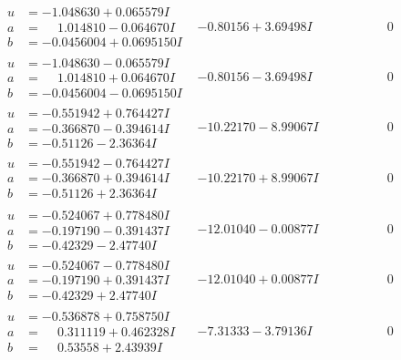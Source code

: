 \documentclass[1p]{elsarticle_modified}
\theoremstyle{definition}
\begin{document}
$$\begin{array}{c|c|c}
\begin{aligned}
u &= -1.048630 + 0.065579 I \\
a &= \phantom{-}1.014810 - 0.064670 I \\
b &= -0.0456004 + 0.0695150 I\end{aligned}
 & -0.80156 + 3.69498 I & \phantom{-0.000000 } 0 \\ \hline\begin{aligned}
u &= -1.048630 - 0.065579 I \\
a &= \phantom{-}1.014810 + 0.064670 I \\
b &= -0.0456004 - 0.0695150 I\end{aligned}
 & -0.80156 - 3.69498 I & \phantom{-0.000000 } 0 \\ \hline\begin{aligned}
u &= -0.551942 + 0.764427 I \\
a &= -0.366870 - 0.394614 I \\
b &= -0.51126 - 2.36364 I\end{aligned}
 & -10.22170 - 8.99067 I & \phantom{-0.000000 } 0 \\ \hline\begin{aligned}
u &= -0.551942 - 0.764427 I \\
a &= -0.366870 + 0.394614 I \\
b &= -0.51126 + 2.36364 I\end{aligned}
 & -10.22170 + 8.99067 I & \phantom{-0.000000 } 0 \\ \hline\begin{aligned}
u &= -0.524067 + 0.778480 I \\
a &= -0.197190 - 0.391437 I \\
b &= -0.42329 - 2.47740 I\end{aligned}
 & -12.01040 - 0.00877 I & \phantom{-0.000000 } 0 \\ \hline\begin{aligned}
u &= -0.524067 - 0.778480 I \\
a &= -0.197190 + 0.391437 I \\
b &= -0.42329 + 2.47740 I\end{aligned}
 & -12.01040 + 0.00877 I & \phantom{-0.000000 } 0 \\ \hline\begin{aligned}
u &= -0.536878 + 0.758750 I \\
a &= \phantom{-}0.311119 + 0.462328 I \\
b &= \phantom{-}0.53558 + 2.43939 I\end{aligned}
 & -7.31333 - 3.79136 I & \phantom{-0.000000 } 0 \\ \hline\begin{aligned}

\end{aligned}
\end{array}$$
\end{document}
